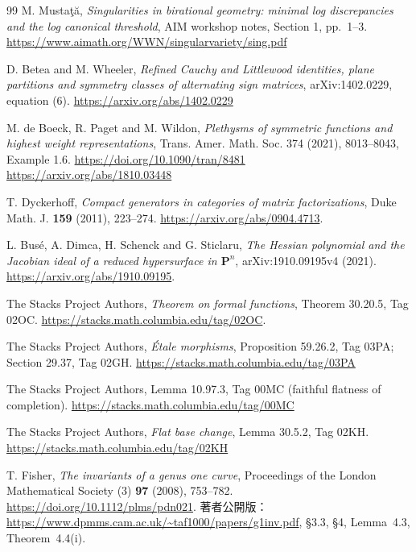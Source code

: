 \documentclass[a4paper,11pt]{ltjsarticle}
\theoremstyle{definition}
\begin{document}
\begin{thebibliography}{99}
M. Musta\c{t}\u{a},
\emph{Singularities in birational geometry: minimal log discrepancies and the log canonical threshold},
AIM workshop notes, Section 1, pp.~1--3.
\url{https://www.aimath.org/WWN/singularvariety/sing.pdf}


D. Betea and M. Wheeler,
\emph{Refined Cauchy and Littlewood identities, plane partitions and
symmetry classes of alternating sign matrices}, arXiv:1402.0229, equation (6).
\url{https://arxiv.org/abs/1402.0229}

M. de Boeck, R. Paget and M. Wildon,
\emph{Plethysms of symmetric functions and highest weight representations},
Trans. Amer. Math. Soc. 374 (2021), 8013--8043, Example 1.6.
\url{https://doi.org/10.1090/tran/8481}
\url{https://arxiv.org/abs/1810.03448}


T. Dyckerhoff,
\emph{Compact generators in categories of matrix factorizations},
Duke Math. J. \textbf{159} (2011), 223--274.
\url{https://arxiv.org/abs/0904.4713}.

L. Bus\'e, A. Dimca, H. Schenck and G. Sticlaru,
\emph{The Hessian polynomial and the Jacobian ideal of a reduced
hypersurface in $\mathbf P^n$}, arXiv:1910.09195v4 (2021).
\url{https://arxiv.org/abs/1910.09195}.

The Stacks Project Authors,
\emph{Theorem on formal functions}, Theorem 30.20.5, Tag 02OC.
\url{https://stacks.math.columbia.edu/tag/02OC}.


The Stacks Project Authors,
\emph{\'Etale morphisms}, Proposition 59.26.2, Tag 03PA;
Section 29.37, Tag 02GH.
\url{https://stacks.math.columbia.edu/tag/03PA}

The Stacks Project Authors,
Lemma 10.97.3, Tag 00MC (faithful flatness of completion).
\url{https://stacks.math.columbia.edu/tag/00MC}

The Stacks Project Authors,
\emph{Flat base change}, Lemma 30.5.2, Tag 02KH.
\url{https://stacks.math.columbia.edu/tag/02KH}

T. Fisher,
\emph{The invariants of a genus one curve},
Proceedings of the London Mathematical Society (3) \textbf{97} (2008), 753--782.
\url{https://doi.org/10.1112/plms/pdn021}.
著者公開版：\url{https://www.dpmms.cam.ac.uk/~taf1000/papers/g1inv.pdf},
\S3.3, \S4, Lemma~4.3, Theorem~4.4(i).


\end{thebibliography}
\end{document}
